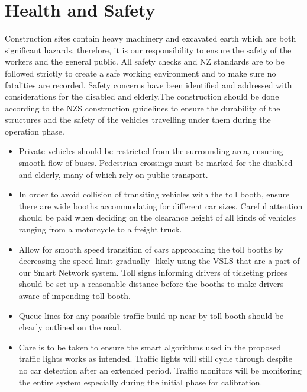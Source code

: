 \documentclass[twoside, a4paper, 11pt]{article}
\begin{document}
\section{Health and Safety}
Construction sites contain heavy machinery and excavated earth which are both significant hazards, therefore, it is our responsibility to ensure the safety of the workers and the general public. All safety checks and NZ standards are to be followed strictly to create a safe working environment and to make sure no fatalities are recorded. Safety concerns have been identified and addressed with considerations for the disabled and elderly.The construction should be done according to the NZS construction guidelines to ensure the durability of the structures and the safety of the vehicles travelling under them during the operation phase.
\begin{itemize}
\item Private vehicles should be restricted from the surrounding area, ensuring smooth flow of buses. Pedestrian crossings must be marked for the disabled and elderly, many of which rely on public transport. 
\item In order to avoid collision of transiting vehicles with the toll booth, ensure there are wide booths accommodating for different car sizes. Careful attention should be paid when deciding on the clearance height of all kinds of vehicles ranging from a motorcycle to a freight truck.
\item Allow for smooth speed transition of cars approaching the toll booths by decreasing the speed limit gradually- likely using the VSLS that are a part of our Smart Network system. Toll signs informing drivers of ticketing prices should be set up a reasonable distance before the booths to make drivers aware of impending toll booth.
\item Queue lines for any possible traffic build up near by toll booth should be clearly outlined on the road.
\item Care is to be taken to ensure the smart algorithms used in the proposed traffic lights works as intended. Traffic lights will still cycle through despite no car detection after an extended period. Traffic monitors will be monitoring the entire system especially during the initial phase for calibration. 
\end{itemize}
\newpage
\end{document}
